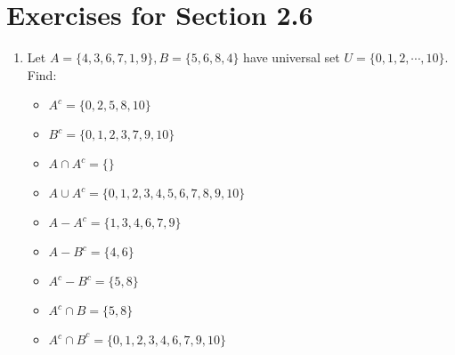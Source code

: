 \documentclass[12pt]{article}
\begin{document}
\section*{Exercises for Section 2.6}
\begin{enumerate}
    \item Let $A=\{4,3,6,7,1,9\}, B=\{5,6,8,4\}$ have universal set $U=\{0,1,2,\cdots, 10\}$. Find:
	\begin{itemize}
	    \item $A^{c} = \{0,2,5,8,10\}$
	    \item $B^{c} = \{0,1,2,3,7,9,10\}$
	    \item $A \cap A^{c} = \{\}$
	    \item $A \cup A^{c} = \{ 0,1,2,3,4,5,6,7,8,9,10\}$
	    \item $A - A^{c} = \{ 1,3,4,6,7,9\}$
	    \item $A - B^{c} = \{ 4,6\}$
	    \item $A ^{c} - B^{c} = \{ 5,8\}$
	    \item $A ^{c} \cap B = \{ 5,8\}$
	    \item ${A ^{c} \cap B}^c = \{ 0,1,2,3,4,6,7,9,10\}$
	\end{itemize}
\end{enumerate}
\end{document}

